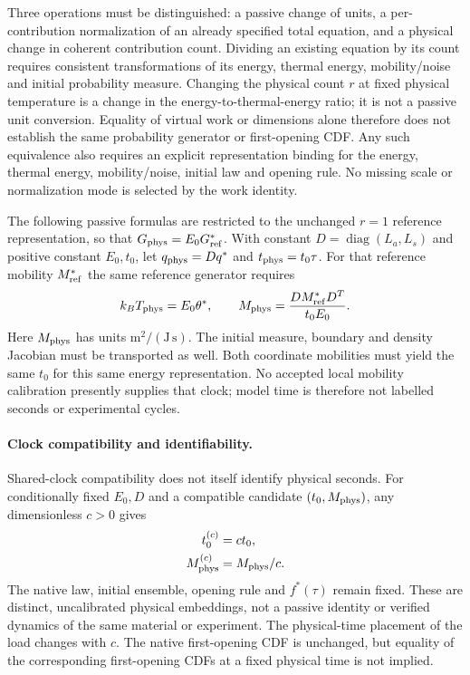 \documentclass[11pt]{article}
\begin{document}
Three operations must be distinguished: a passive change of units, a
per-contribution normalization of an already specified total equation, and
a physical change in coherent contribution count.
Dividing an existing equation by its count requires consistent transformations
of its energy, thermal energy, mobility/noise and initial probability measure.
Changing the physical count $r$ at fixed physical temperature is a change
in the energy-to-thermal-energy ratio; it is not a passive unit conversion.
Equality of virtual work or dimensions alone therefore does not establish
the same probability generator or first-opening CDF. Any such equivalence
also requires an explicit representation binding for the energy, thermal
energy, mobility/noise, initial law and opening rule. No missing scale or
normalization mode is selected by the work identity.

The following passive formulas are restricted to the unchanged $r=1$
reference representation, so that $G_{\rm phys}=E_0G_{\rm ref}^*$.
With constant $D=\operatorname{diag}(L_a,L_s)$ and positive constant
$E_0,t_0$, let $q_{\rm phys}=Dq^*$ and $t_{\rm phys}=t_0\tau$.
For that reference mobility $M_{\rm ref}^*$ the same reference generator requires
\begin{equation}
 k_BT_{\rm phys}=E_0\theta^*,\qquad
 M_{\rm phys}=\frac{DM_{\rm ref}^*D^T}{t_0E_0}.
\end{equation}
Here $M_{\rm phys}$ has units $\mathrm{m^2/(J\,s)}$.
The initial measure, boundary and density Jacobian must be transported as well.
Both coordinate mobilities must yield the same $t_0$ for this same energy
representation. No accepted local mobility calibration presently supplies
that clock; model time is therefore not labelled seconds or experimental cycles.

\paragraph{Clock compatibility and identifiability.}
Shared-clock compatibility does not itself identify physical seconds.
For conditionally fixed $E_0,D$ and a compatible candidate
$(t_0,M_{\rm phys})$, any dimensionless $c>0$ gives
\begin{equation}
\begin{aligned}
 t_0^{(c)}&=ct_0,\\
 M_{\rm phys}^{(c)}&=M_{\rm phys}/c .
\end{aligned}
\end{equation}
The native law, initial ensemble, opening rule and $f^*(\tau)$ remain
fixed. These are distinct, uncalibrated physical embeddings, not a
passive identity or verified dynamics of the same material or experiment.
The physical-time placement of the load changes with $c$. The native
first-opening CDF is unchanged, but equality of the corresponding
first-opening CDFs at a fixed physical time is not implied.
\end{document}

